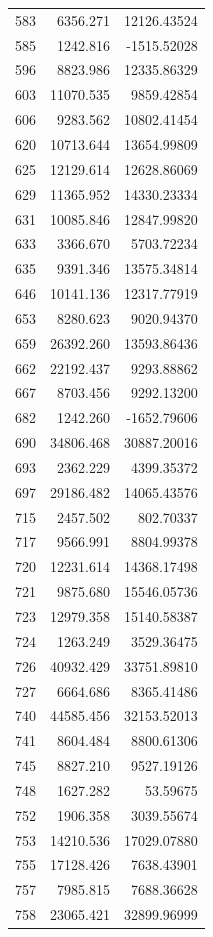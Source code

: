 \documentclass[
  12pt,
]{article}
\begin{document}
\begin{longtable}[]{@{}lrr@{}}
583 & 6356.271 & 12126.43524 \\
585 & 1242.816 & -1515.52028 \\
596 & 8823.986 & 12335.86329 \\
603 & 11070.535 & 9859.42854 \\
606 & 9283.562 & 10802.41454 \\
620 & 10713.644 & 13654.99809 \\
625 & 12129.614 & 12628.86069 \\
629 & 11365.952 & 14330.23334 \\
631 & 10085.846 & 12847.99820 \\
633 & 3366.670 & 5703.72234 \\
635 & 9391.346 & 13575.34814 \\
646 & 10141.136 & 12317.77919 \\
653 & 8280.623 & 9020.94370 \\
659 & 26392.260 & 13593.86436 \\
662 & 22192.437 & 9293.88862 \\
667 & 8703.456 & 9292.13200 \\
682 & 1242.260 & -1652.79606 \\
690 & 34806.468 & 30887.20016 \\
693 & 2362.229 & 4399.35372 \\
697 & 29186.482 & 14065.43576 \\
715 & 2457.502 & 802.70337 \\
717 & 9566.991 & 8804.99378 \\
720 & 12231.614 & 14368.17498 \\
721 & 9875.680 & 15546.05736 \\
723 & 12979.358 & 15140.58387 \\
724 & 1263.249 & 3529.36475 \\
726 & 40932.429 & 33751.89810 \\
727 & 6664.686 & 8365.41486 \\
740 & 44585.456 & 32153.52013 \\
741 & 8604.484 & 8800.61306 \\
745 & 8827.210 & 9527.19126 \\
748 & 1627.282 & 53.59675 \\
752 & 1906.358 & 3039.55674 \\
753 & 14210.536 & 17029.07880 \\
755 & 17128.426 & 7638.43901 \\
757 & 7985.815 & 7688.36628 \\
758 & 23065.421 & 32899.96999 \\

\end{longtable}
\end{document}
